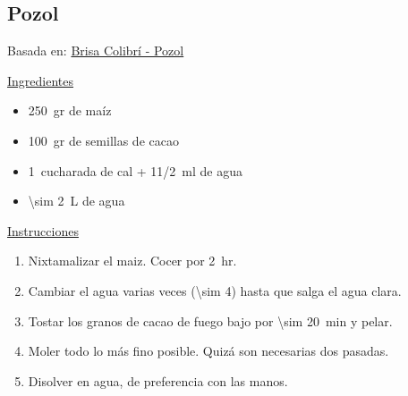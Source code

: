 \subsection{Pozol}

Basada en: \href{https://www.youtube.com/watch?v=YW4xRdy0nHs}{Brisa Colibrí - Pozol}

\underline{Ingredientes}

\begin{itemize}
\item \SI{250}{gr} de maíz
\item \SI{100}{gr} de semillas de cacao
\item \SI{1}{cucharada} de cal + 1\SI{1/2}{ml} de agua
\item \SI{\sim 2}{L} de agua
\end{itemize}


\underline{Instrucciones}

\begin{enumerate}
\item Nixtamalizar el maiz. Cocer por \SI{2}{hr}.
\item Cambiar el agua varias veces (\num{\sim 4}) hasta que salga el agua clara.
\item Tostar los granos de cacao de fuego bajo por \SI{\sim 20}{min} y pelar.
\item Moler todo lo más fino posible. Quizá son necesarias dos pasadas.
\item Disolver en agua, de preferencia con las manos.
\end{enumerate}
